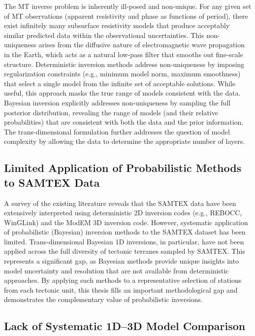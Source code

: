The MT inverse problem is inherently ill-posed and non-unique. For any given set of MT observations (apparent resistivity and phase as functions of period), there exist infinitely many subsurface resistivity models that produce acceptably similar predicted data within the observational uncertainties. This non-uniqueness arises from the diffusive nature of electromagnetic wave propagation in the Earth, which acts as a natural low-pass filter that smooths out fine-scale structure. Deterministic inversion methods address non-uniqueness by imposing regularization constraints (e.g., minimum model norm, maximum smoothness) that select a single model from the infinite set of acceptable solutions. While useful, this approach masks the true range of models consistent with the data. Bayesian inversion explicitly addresses non-uniqueness by sampling the full posterior distribution, revealing the range of models (and their relative probabilities) that are consistent with both the data and the prior information. The trans-dimensional formulation further addresses the question of model complexity by allowing the data to determine the appropriate number of layers.

\subsection*{Limited Application of Probabilistic Methods to SAMTEX Data}

A survey of the existing literature reveals that the SAMTEX data have been extensively interpreted using deterministic 2D inversion codes (e.g., REBOCC, WinGLink) and the ModEM 3D inversion code. However, systematic application of probabilistic (Bayesian) inversion methods to the SAMTEX dataset has been limited. Trans-dimensional Bayesian 1D inversions, in particular, have not been applied across the full diversity of tectonic terranes sampled by SAMTEX. This represents a significant gap, as Bayesian methods provide unique insights into model uncertainty and resolution that are not available from deterministic approaches. By applying such methods to a representative selection of stations from each tectonic unit, this thesis fills an important methodological gap and demonstrates the complementary value of probabilistic inversions.

\subsection*{Lack of Systematic 1D--3D Model Comparison}

